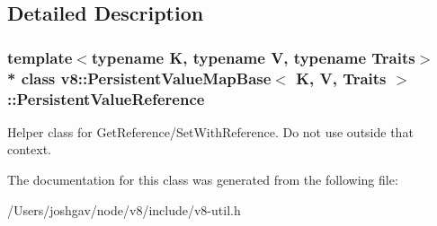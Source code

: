 \subsection{Detailed Description}
\subsubsection*{template$<$typename K, typename V, typename Traits$>$\\*
class v8\+::\+Persistent\+Value\+Map\+Base$<$ K, V, Traits $>$\+::\+Persistent\+Value\+Reference}

Helper class for Get\+Reference/\+Set\+With\+Reference. Do not use outside that context. 

The documentation for this class was generated from the following file\+:\begin{DoxyCompactItemize}
\item 
/\+Users/joshgav/node/v8/include/v8-\/util.\+h\end{DoxyCompactItemize}
